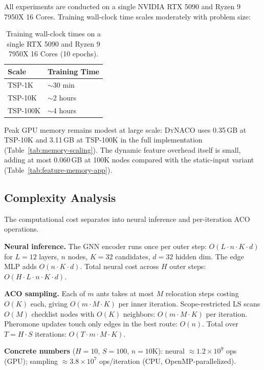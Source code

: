 \documentclass[sigconf,nonacm]{acmart}
\newcommand{\DyNACO}{\textsc{DyNACO}}
\begin{document}
All experiments are conducted on a single NVIDIA RTX 5090 and Ryzen 9 7950X 16 Cores.
Training wall-clock time scales moderately with problem size:

\begin{table}[h]
\centering
\caption{Training wall-clock times on a single RTX 5090 and Ryzen 9 7950X 16 Cores (10 epochs).}
\label{tab:training-times}
\small
\begin{tabularx}{\columnwidth}{lY}
\toprule
Scale & Training Time \\
\midrule
TSP-1K   & $\sim$30 min \\
TSP-10K  & $\sim$2 hours \\
TSP-100K & $\sim$4 hours \\
\bottomrule
\end{tabularx}
\end{table}

Peak GPU memory remains modest at large scale: \DyNACO{} uses 0.35\,GB at TSP-10K and 3.11\,GB at TSP-100K in the full implementation (Table~\ref{tab:memory-scaling}). The dynamic feature overhead itself is small, adding at most 0.060\,GB at 100K nodes compared with the static-input variant (Table~\ref{tab:feature-memory-app}).

\subsection{Complexity Analysis}
\label{app:complexity}

The computational cost separates into neural inference and per-iteration ACO operations.

\textbf{Neural inference.}
The GNN encoder runs once per outer step: $O(L \cdot n \cdot K \cdot d)$ for $L{=}12$ layers, $n$ nodes, $K{=}32$ candidates, $d{=}32$ hidden dim.
The edge MLP adds $O(n \cdot K \cdot d)$.
Total neural cost across $H$ outer steps: $O(H \cdot L \cdot n \cdot K \cdot d)$.

\textbf{ACO sampling.}
Each of $m$ ants takes at most $M$ relocation steps costing $O(K)$ each, giving $O(m \cdot M \cdot K)$ per inner iteration.
Scope-restricted LS scans $O(M)$ checklist nodes with $O(K)$ neighbors: $O(m \cdot M \cdot K)$ per iteration.
Pheromone updates touch only edges in the best route: $O(n)$.
Total over $T{=}H \cdot S$ iterations: $O(T \cdot m \cdot M \cdot K)$.

\textbf{Concrete numbers} ($H{=}10$, $S{=}100$, $n{=}10$K):
neural $\approx 1.2 \times 10^9$ ops (GPU); sampling $\approx 3.8 \times 10^7$ ops/iteration (CPU, OpenMP-parallelized).
\end{document}
